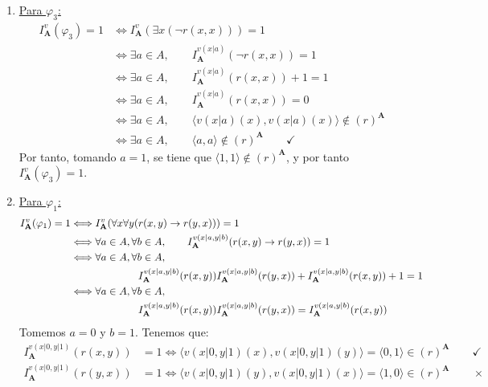 \documentclass[12pt]{article}
\renewcommand{\bf}[1]{\mathbf{#1}}
\begin{document}
\begin{ejercicio}
\begin{enumerate}
\begin{enumerate}
                \item \underline{Para $\varphi_3$:}
                \begin{align*}
                    I_{\bf{A}}^v(\varphi_3) = 1 & \Longleftrightarrow I_{\bf{A}}^v(\exists x (\lnot r(x, x)))=1\\
                    & \Longleftrightarrow \exists a\in A, \qquad I_{\bf{A}}^{v(x|a)}(\lnot r(x, x))=1\\
                    & \Longleftrightarrow \exists a\in A, \qquad I_{\bf{A}}^{v(x|a)}(r(x, x))+1=1\\
                    & \Longleftrightarrow \exists a\in A, \qquad I_{\bf{A}}^{v(x|a)}(r(x, x))=0 \\
                    & \Longleftrightarrow \exists a\in A, \qquad \langle v(x|a)(x),v(x|a)(x)\rangle\notin (r)^{\bf{A}}\\
                    & \Longleftrightarrow \exists a\in A, \qquad \langle a,a\rangle\notin (r)^{\bf{A}} \qquad \checkmark
                \end{align*}
                Por tanto, tomando $a=1$, se tiene que $\langle 1,1\rangle\notin (r)^{\bf{A}}$, y por tanto $I_{\bf{A}}^v(\varphi_3)=1$.
    
                \item \underline{Para $\varphi_1$:}
                \begin{align*}
                    I_{\bf{A}}^v(\varphi_1) = 1 & \Longleftrightarrow I_{\bf{A}}^v(\forall x \forall y (r(x, y) \rightarrow r(y, x)))=1\\
                    & \Longleftrightarrow \forall a\in A, \forall b\in A,\qquad I_{\bf{A}}^{v(x|a,y|b)}(r(x, y) \rightarrow r(y, x))=1\\
                    & \Longleftrightarrow \forall a\in A, \forall b\in A,\\&\hspace{2.3cm}I_{\bf{A}}^{v(x|a,y|b)}(r(x, y))I_{\bf{A}}^{v(x|a,y|b)}(r(y, x))+I_{\bf{A}}^{v(x|a,y|b)}(r(x, y))+1=1\\
                    & \Longleftrightarrow \forall a\in A, \forall b\in A,\\&\hspace{2.3cm}I_{\bf{A}}^{v(x|a,y|b)}(r(x, y))I_{\bf{A}}^{v(x|a,y|b)}(r(y, x))=I_{\bf{A}}^{v(x|a,y|b)}(r(x, y))
                \end{align*}
                Tomemos $a=0$ y $b=1$. Tenemos que:
                \begin{align*}
                    I_{\bf{A}}^{v(x|0,y|1)}(r(x, y)) &= 1 \Longleftrightarrow \langle v(x|0,y|1)(x),v(x|0,y|1)(y)\rangle = \langle 0,1\rangle\in (r)^{\bf{A}} \qquad \checkmark\\
                    I_{\bf{A}}^{v(x|0,y|1)}(r(y, x)) &= 1 \Longleftrightarrow \langle v(x|0,y|1)(y),v(x|0,y|1)(x)\rangle = \langle 1,0\rangle\in (r)^{\bf{A}} \qquad \times
                \end{align*}
    

\end{enumerate}
\end{enumerate}
\end{ejercicio}
\end{document}
